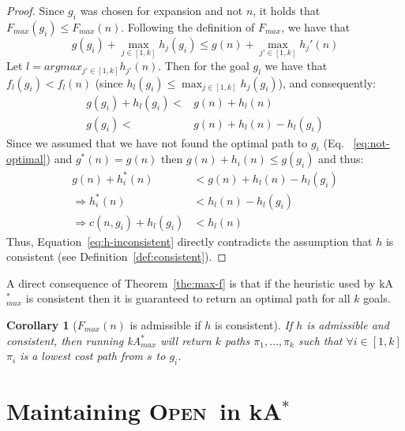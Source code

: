 \documentclass{aicom2e}
\newtheorem{corollary}{Corollary}
\newcommand{\kastar}{kA$^*$}
\newcommand{\kastarmax}{kA$^*_{max}$}
\newcommand{\maxf}{$F_{max}(n)$}
\newcommand{\open}{\textsc{Open}}
\begin{document}
\begin{proof}
	Since $g_i$ was chosen for expansion and not $n$, it holds that $ F_{max}(g_i) \leq F_{max}(n) $. 
	Following the definition of $F_{max}$, we have that
	\begin{equation}
	g(g_i) + \max_{j\in [1,k]} h_{j}(g_i) \leq g(n)+\max_{j'\in [1,k]} h_j'(n)
	\end{equation}
	Let $l=argmax_{j'\in [1,k]} h_{j'}(n)$.
	Then for the goal $g_l$ we have that
	$f_l(g_i) < f_l(n)$ (since $h_l(g_i) \leq \max_{j\in [1,k]} h_{j}(g_i)$), and consequently:
	\begin{align}
	g(g_i)+h_l(g_i) < & g(n)+h_l(n) \\
	g(g_i) < & g(n)+h_l(n) - h_l(g_i)
	\end{align}
	Since we assumed that we have not found the optimal path to $g_i$ (Eq.~ \ref{eq:not-optimal}) 
	and $g^*(n)=g(n)$ then
	$g(n)+h_i(n)\leq g(g_i)$ and thus:
	\begin{align}
	g(n)+h^*_i(n)  & < g(n)+h_l(n) - h_l(g_i)\\
	\Rightarrow h^*_i(n)  & < h_l(n) - h_l(g_i)\\
	\Rightarrow c(n,g_i) + h_l(g_i) & < h_l(n) \label{eq:h-inconsistent}
	\end{align}
	Thus, Equation~\ref{eq:h-inconsistent} directly contradicts the assumption
	that $h$ is consistent (see Definition~\ref{def:consistent}).
\end{proof}


A direct consequence of Theorem~\ref{the:max-f} is that 
if the heuristic used by \kastarmax{} is consistent then 
it is guaranteed to return an optimal path for all $k$ goals.

\begin{corollary}[\maxf{} is admissible if $h$ is consistent]
If $h$ is admissible and consistent, then running
\kastarmax{} will return $k$ paths $\pi_1,\ldots, \pi_k$ such that $\forall i\in[1,k]$ $\pi_i$ is a lowest cost path from $s$ to $g_i$. \label{cor:max-f}
\end{corollary}



\section{Maintaining \open\ in \kastar{}} \label{sec:lazy}
\end{document}
